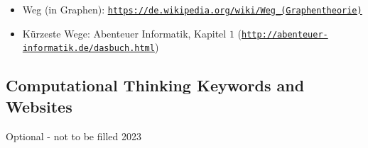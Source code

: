 \documentclass[a4paper,11pt]{report}
\newcommand{\BrochureUrlText}[1]{\texttt{#1}}
\begin{document}
\begin{itemize}
  \item Weg (in Graphen): \href{https://de.wikipedia.org/wiki/Weg_(Graphentheorie)}{\BrochureUrlText{https://de.wikipedia.org/wiki/Weg\_(Graphentheorie)}}
  \item Kürzeste Wege:  Abenteuer Informatik, Kapitel $1$  (\href{http://abenteuer-informatik.de/dasbuch.html}{\BrochureUrlText{http://abenteuer-informatik.de/dasbuch.html}})
\end{itemize}


\subsection*{Computational Thinking Keywords and Websites}

Optional - not to be filled 2023
\end{document}
